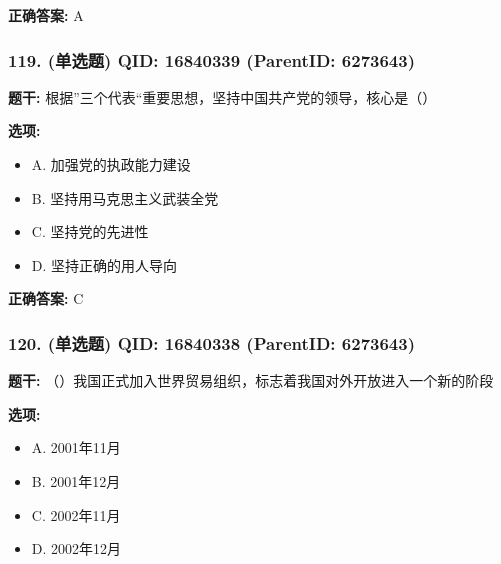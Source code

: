 \documentclass[12pt,UTF8]{ctexart}
\begin{document}
\textbf{正确答案:}
A

\vspace{0.3em}\hrulefill\vspace{0.7em}

\subsubsection*{119. (单选题) \small QID: 16840339 (ParentID: 6273643)}

\textbf{题干:}
根据”三个代表“重要思想，坚持中国共产党的领导，核心是（）



\textbf{选项:}
\begin{itemize}[leftmargin=*]

  \item A. 加强党的执政能力建设

  \item B. 坚持用马克思主义武装全党

  \item C. 坚持党的先进性

  \item D. 坚持正确的用人导向

\end{itemize}

\textbf{正确答案:}
C

\vspace{0.3em}\hrulefill\vspace{0.7em}

\subsubsection*{120. (单选题) \small QID: 16840338 (ParentID: 6273643)}

\textbf{题干:}
（）我国正式加入世界贸易组织，标志着我国对外开放进入一个新的阶段



\textbf{选项:}
\begin{itemize}[leftmargin=*]

  \item A. 2001年11月

  \item B. 2001年12月

  \item C. 2002年11月

  \item D. 2002年12月

\end{itemize}
\end{document}
